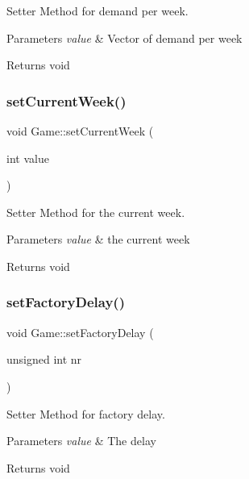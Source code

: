 Setter Method for demand per week. 


\begin{DoxyParams}{Parameters}
{\em value} & Vector of demand per week \\
\hline
\end{DoxyParams}
\begin{DoxyReturn}{Returns}
void 
\end{DoxyReturn}
\mbox{\label{classGame_a48333f5891fa3d7f7bd74a9757bab257}} 
\subsubsection{\texorpdfstring{set\+Current\+Week()}{setCurrentWeek()}}
{\footnotesize\ttfamily void Game\+::set\+Current\+Week (\begin{DoxyParamCaption}\item[{int}]{value }\end{DoxyParamCaption})}



Setter Method for the current week. 


\begin{DoxyParams}{Parameters}
{\em value} & the current week \\
\hline
\end{DoxyParams}
\begin{DoxyReturn}{Returns}
void 
\end{DoxyReturn}
\mbox{\label{classGame_a6b53474fddd090df8ee7eb00512fccb6}} 
\subsubsection{\texorpdfstring{set\+Factory\+Delay()}{setFactoryDelay()}}
{\footnotesize\ttfamily void Game\+::set\+Factory\+Delay (\begin{DoxyParamCaption}\item[{unsigned int}]{nr }\end{DoxyParamCaption})}



Setter Method for factory delay. 


\begin{DoxyParams}{Parameters}
{\em value} & The delay \\
\hline
\end{DoxyParams}
\begin{DoxyReturn}{Returns}
void 
\end{DoxyReturn}
\mbox{\label{classGame_ab7b398c385cec5ea920d1b5053a1e707}} 
